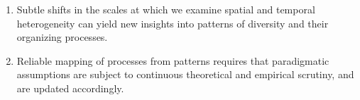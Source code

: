 \begin{enumerate}
  
\item Subtle shifts in the scales at which we examine spatial and temporal heterogeneity can yield new insights into patterns of diversity and their organizing processes.

\item Reliable mapping of processes from patterns requires that paradigmatic assumptions are subject to continuous theoretical and empirical scrutiny, and are updated accordingly.  
 
\end{enumerate}
 

 
%
%
%

